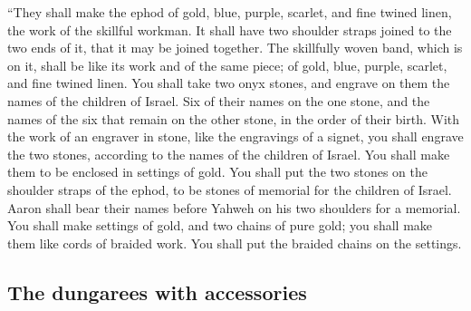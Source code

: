  ``They shall make the ephod of gold, blue, purple,
scarlet, and fine twined linen, the work of the skillful workman.
 It shall have two shoulder straps joined to the two ends
of it, that it may be joined together.  The skillfully
woven band, which is on it, shall be like its work and of the same
piece; of gold, blue, purple, scarlet, and fine twined linen.
 You shall take two onyx stones, and engrave on them the
names of the children of Israel.  Six of their names on
the one stone, and the names of the six that remain on the other stone,
in the order of their birth.  With the work of an
engraver in stone, like the engravings of a signet, you shall engrave
the two stones, according to the names of the children of Israel. You
shall make them to be enclosed in settings of gold.  You
shall put the two stones on the shoulder straps of the ephod, to be
stones of memorial for the children of Israel. Aaron shall bear their
names before Yahweh on his two shoulders for a memorial. 
You shall make settings of gold,  and two chains of pure
gold; you shall make them like cords of braided work. You shall put the
braided chains on the settings.

\hypertarget{the-dungarees-with-accessories}{%
\subsection{The dungarees with
accessories}\label{the-dungarees-with-accessories}}

